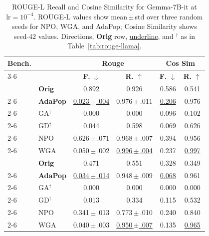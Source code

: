 \begin{table}[ht]
\centering
\footnotesize
\setlength{\tabcolsep}{2.5pt}
\begin{tabularx}{\linewidth}{|l|>{\centering\arraybackslash}X|c|c|c|c|}
\hline
\multirow{2}{*}{\textbf{Bench.}} & \multirow{2}{*}{\textbf{Algorithm}} & \multicolumn{2}{c|}{\textbf{Rouge}} & \multicolumn{2}{c|}{\textbf{Cos Sim}} \\ \cline{3-6}
 & & \textbf{F.} $\downarrow$ & \textbf{R.} $\uparrow$ & \textbf{F.} $\downarrow$ & \textbf{R.} $\uparrow$ \\ \hline
\rowcolor{cyan!15} \cellcolor{white} & \textbf{Orig} & 0.892 & 0.926 & 0.586 & 0.541 \\ \cline{2-6}
\rowcolor{violet!15} \cellcolor{white} & \textbf{AdaPop} & \underline{0.023{\tiny\,$\pm$\,.004}} & 0.976{\tiny\,$\pm$\,.011} & \underline{0.206} & 0.976 \\ \cline{2-6}
\rowcolor{gray!10} \cellcolor{white} & GA$^\dag$ & 0.000 & 0.000 & 0.096 & 0.102 \\ \cline{2-6}
\cellcolor{white} & GD$^\dag$ & 0.044 & 0.598 & 0.069 & 0.626 \\ \cline{2-6}
\rowcolor{gray!10} \cellcolor{white} & NPO & 0.626{\tiny\,$\pm$\,.071} & 0.968{\tiny\,$\pm$\,.007} & 0.394 & 0.956 \\ \cline{2-6}
\multirow{-6}{*}{\textbf{DUET}} \cellcolor{white} & WGA & 0.050{\tiny\,$\pm$\,.002} & \underline{0.996{\tiny\,$\pm$\,.004}} & 0.237 & \underline{0.997} \\ \hline
\rowcolor{cyan!15} \cellcolor{white} & \textbf{Orig} & 0.471 & 0.551 & 0.328 & 0.349 \\ \cline{2-6}
\rowcolor{violet!15} \cellcolor{white} & \textbf{AdaPop} & \underline{0.034{\tiny\,$\pm$\,.014}} & 0.948{\tiny\,$\pm$\,.009} & \underline{0.068} & 0.961 \\ \cline{2-6}
\rowcolor{gray!10} \cellcolor{white} & GA$^\dag$ & 0.000 & 0.000 & 0.000 & 0.000 \\ \cline{2-6}
\cellcolor{white} & GD$^\dag$ & 0.013 & 0.334 & 0.115 & 0.532 \\ \cline{2-6}
\rowcolor{gray!10} \cellcolor{white} & NPO & 0.341{\tiny\,$\pm$\,.013} & 0.773{\tiny\,$\pm$\,.010} & 0.240 & 0.840 \\ \cline{2-6}
\multirow{-6}{*}{\textbf{RWKU}} \cellcolor{white} & WGA & 0.040{\tiny\,$\pm$\,.003} & \underline{0.950{\tiny\,$\pm$\,.007}} & 0.135 & \underline{0.965} \\ \hline
\end{tabularx}
\caption{ROUGE-L Recall and Cosine Similarity for Gemma-7B-it at $\text{lr}=10^{-4}$. ROUGE-L values show mean\,$\pm$\,std over three random seeds for NPO, WGA, and AdaPop; Cosine Similarity shows seed-42 values. Directions, \textbf{Orig} row, \underline{underline}, and $^\dag$ as in Table~\ref{tab:rouge-llama}.}
\label{tab:rouge-gemma}
\end{table}

